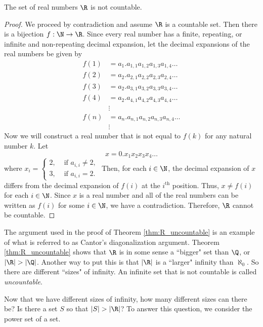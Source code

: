 \begin{theorem} \label{thm:R_uncountable} The set of real numbers $\R$ is not countable.
\end{theorem}

\begin{proof} We proceed by contradiction and assume $\R$ is a countable set. Then there is a bijection $f : \N \to \R$. Since every real number has a finite, repeating, or infinite and non-repeating decimal expansion, let the decimal expansions of the real numbers be given by  
\begin{align*}
f(1) &= a_1.a_{1,1} a_{1,2} a_{1,3} a_{1,4} \ldots \\
f(2) &= a_2.a_{2,1} a_{2,2} a_{2,3} a_{2,4} \ldots \\
f(3) &= a_2.a_{3,1} a_{3,2} a_{3,3} a_{3,4} \ldots \\
f(4) &= a_2.a_{4,1} a_{4,2} a_{4,3} a_{4,4} \ldots \\
&  \vdots  \\
f(n) &= a_n.a_{n,1} a_{n,2} a_{n,3} a_{n,4} \ldots \\
&  \vdots 
\end{align*}
Now we will construct a real number that is not equal to $f(k)$ for any natural number $k$. Let 
\[x = 0.x_1 x_2 x_3 x_4 \ldots\]
where $x_i = 
\begin{cases}
2, &\text{ if $a_{i,i} \neq 2$}, \\
3, &\text{ if $a_{i,i} = 2$}.
\end{cases}$
Then, for each $i \in \N$, the decimal expansion of $x$ differs from the decimal expansion of $f(i)$ at the $i^{\text{th}}$ position. Thus, $x \neq f(i)$ for each $i \in \N$. Since $x$ is a real number and all of the real numbers can be written as $f(i)$ for some $i \in \N$, we have a contradiction. Therefore, $\R$ cannot be countable. 
\end{proof}

The argument used in the proof of Theorem \ref{thm:R_uncountable} is an example of what is referred to as Cantor's diagonalization argument. Theorem \ref{thm:R_uncountable} shows that $\R$ is in some sense a ``bigger" set than $\Q$, or $|\R| > |\Q|$. Another way to put this is that $|\R|$ is a ``larger" infinity than $\aleph_0$. So there are different ``sizes" of infinity. An infinite set that is not countable is called \emph{uncountable}. 

\label{sec_uncount_set}

Now that we have different sizes of infinity, how many different sizes can there be? Is there a set $S$ so that $|S| > |\R|$? To answer this question, we consider the power set of a set. 

